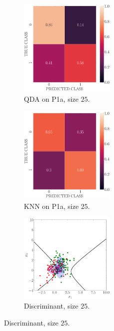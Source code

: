 \documentclass[11pt, a4 paper]{article}
\begin{document}
\begin{figure}[!htbp]
\quad    
    \begin{subfigure}[!htbp]{0.24\textwidth}
       \centering
       \includegraphics[width=1.8in]{../results/ex1/conf_mtx_QD_ML_dataset_P1a_size_25.pdf}
       \caption{QDA on P1a, size $25$.}
       \label{fig:QDA_P1a_25}
    \end{subfigure}
\quad    
    \begin{subfigure}[!htbp]{0.24\textwidth}
       \centering
       \includegraphics[width=1.8in]{../results/ex1/conf_mtx_KNN_dataset_P1a_size_25.pdf}
       \caption{KNN on P1a, size $25$.}
       \label{fig:KNN_P1a_25}
    \end{subfigure}
\quad
    \begin{subfigure}[!htbp]{0.24\textwidth}
       \centering
       \includegraphics[width=1.8in]{../results/ex1/samples_QD_ML_dataset_P1a_size_25.pdf}
       \caption{Discriminant, size $25$.}
       \label{fig:DF_P1a_25}
    \end{subfigure}
    

\end{figure}
\end{document}
